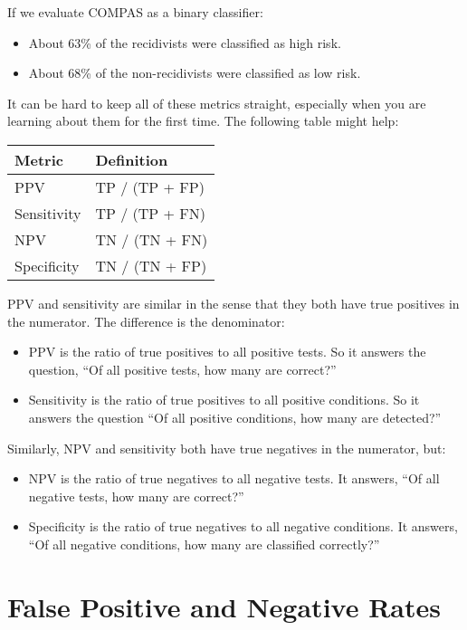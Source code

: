 If we evaluate COMPAS as a binary classifier:

\begin{itemize}
\item
  About 63\% of the recidivists were classified as high risk.
\item
  About 68\% of the non-recidivists were classified as low risk.
\end{itemize}

It can be hard to keep all of these metrics straight, especially when
you are learning about them for the first time. The following table
might help:

\begin{longtable}[]{ll}
\midrule
Metric & Definition \\
\midrule
\endhead
\midrule
\endlastfoot
PPV & TP / (TP + FP) \\
Sensitivity & TP / (TP + FN) \\
NPV & TN / (TN + FN) \\
Specificity & TN / (TN + FP) \\
\end{longtable}

PPV and sensitivity are similar in the sense that they both have true
positives in the numerator. The difference is the denominator:

\begin{itemize}
\item
  PPV is the ratio of true positives to all positive tests. So it
  answers the question, ``Of all positive tests, how many are correct?''
\item
  Sensitivity is the ratio of true positives to all positive conditions.
  So it answers the question ``Of all positive conditions, how many are
  detected?''
\end{itemize}

Similarly, NPV and sensitivity both have true negatives in the
numerator, but:

\begin{itemize}
\item
  NPV is the ratio of true negatives to all negative tests. It answers,
  ``Of all negative tests, how many are correct?''
\item
  Specificity is the ratio of true negatives to all negative conditions.
  It answers, ``Of all negative conditions, how many are classified
  correctly?''
\end{itemize}

\section{False Positive and Negative
Rates}\label{false-positive-and-negative-rates}

